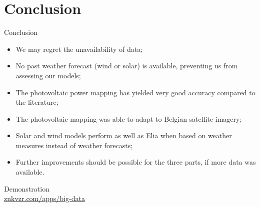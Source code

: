 \documentclass[12pt]{beamer}
\begin{document}
\section{Conclusion}

\begin{frame}{Conclusion}
	\begin{itemize}
	    \item We may regret the \alert{unavailability of data};
	    \item \alert{No past weather forecast} (wind or solar) is available, preventing us from assessing our models;
	    \item The photovoltaic power mapping has yielded very \alert{good accuracy} compared to the literature;
	    \item The photovoltaic mapping was \alert{able to adapt} to Belgian satellite imagery;
	    \item Solar and wind models \alert{perform as well as Elia} when based \alert{on weather measures} instead of weather forecasts;
	    \item Further \alert{improvements should be possible} for the three parts, if more data was available.
	\end{itemize}
\end{frame}

\begin{frame}[standout]
    \vspace{1em}
    Demonstration \\
    \href{https://znkvzr.com/apps/big-data/}{znkvzr.com/apps/big-data}
\end{frame}

\begin{frame}[allowframebreaks]
    \printbibliography
\end{frame}
\end{document}

